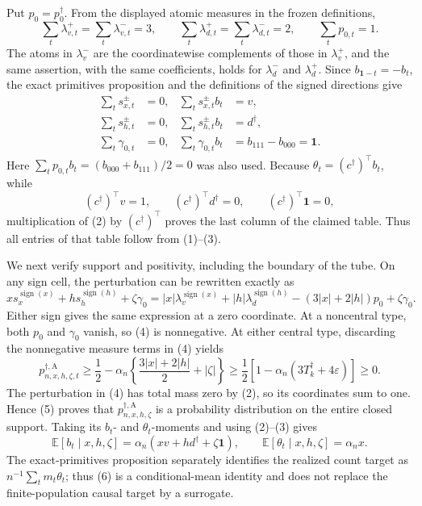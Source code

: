 Put \(p_0=p_0^\dagger\).  From the displayed atomic measures in the frozen definitions,
\[
 \sum_t\lambda_{v,t}^+=\sum_t\lambda_{v,t}^-=3,
 \qquad
 \sum_t\lambda_{d,t}^+=\sum_t\lambda_{d,t}^-=2,
 \qquad
 \sum_t p_{0,t}=1.
\tag{1}
\]
The atoms in \(\lambda_v^-\) are the coordinatewise complements of those in
\(\lambda_v^+\), and the same assertion, with the same coefficients, holds for
\(\lambda_d^-\) and \(\lambda_d^+\).  Since \(b_{\mathbf1-t}=-b_t\), the exact
primitives proposition and the definitions of the signed directions give
\[
\begin{aligned}
 \sum_t s_{x,t}^\pm&=0,&
 \sum_t s_{x,t}^\pm b_t&=v,\\
 \sum_t s_{h,t}^\pm&=0,&
 \sum_t s_{h,t}^\pm b_t&=d^\dagger,\\
 \sum_t\gamma_{0,t}&=0,&
 \sum_t\gamma_{0,t}b_t&=b_{111}-b_{000}=\mathbf1.
\end{aligned}
\tag{2}
\]
Here \(\sum_t p_{0,t}b_t=(b_{000}+b_{111})/2=0\) was also used.  Because
\(\theta_t=(c^\dagger)^\top b_t\), while
\[
 (c^\dagger)^\top v=1,
 \qquad (c^\dagger)^\top d^\dagger=0,
 \qquad (c^\dagger)^\top\mathbf1=0,
\tag{3}
\]
multiplication of (2) by \((c^\dagger)^\top\) proves the last column of the
claimed table.  Thus all entries of that table follow from (1)--(3).

We next verify support and positivity, including the boundary of the tube.  On any
sign cell, the perturbation can be rewritten exactly as
\[
 x s_x^{\operatorname{sign}(x)}
 +h s_h^{\operatorname{sign}(h)}+\zeta\gamma_0
 =|x|\lambda_v^{\operatorname{sign}(x)}
  +|h|\lambda_d^{\operatorname{sign}(h)}
  -(3|x|+2|h|)p_0+\zeta\gamma_0.
\tag{4}
\]
Either sign gives the same expression at a zero coordinate.  At a noncentral
type, both \(p_0\) and \(\gamma_0\) vanish, so (4) is nonnegative.  At either
central type, discarding the nonnegative measure terms in (4) yields
\[
 p_{n,x,h,\zeta,t}^{\dagger,\mathrm A}
 \ge \frac12-\alpha_n\left\{
 \frac{3|x|+2|h|}{2}+|\zeta|\right\}
 \ge \frac12\left[1-\alpha_n(3T_k^\dagger+4\varepsilon)\right]\ge0.
\tag{5}
\]
The perturbation in (4) has total mass zero by (2), so its coordinates sum to
one.  Hence (5) proves that \(p_{n,x,h,\zeta}^{\dagger,\mathrm A}\) is a
probability distribution on the entire closed support.  Taking its \(b_t\)- and
\(\theta_t\)-moments and using (2)--(3) gives
\[
 \mathbb E[b_t\mid x,h,\zeta]
 =\alpha_n(xv+hd^\dagger+\zeta\mathbf1),
 \qquad
 \mathbb E[\theta_t\mid x,h,\zeta]=\alpha_nx.
\tag{6}
\]
The exact-primitives proposition separately identifies the realized count target as
\(n^{-1}\sum_tm_t\theta_t\); thus (6) is a conditional-mean identity and does not
replace the finite-population causal target by a surrogate.

